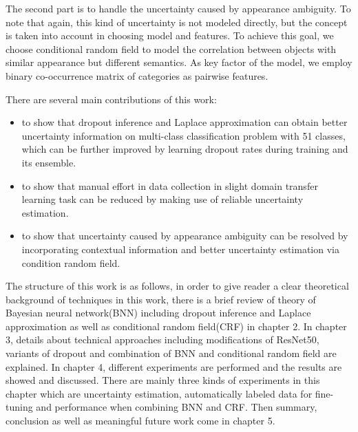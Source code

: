 The second part is to handle the uncertainty caused by appearance ambiguity. To note that again, this kind of uncertainty is not modeled directly, but the concept is taken into account in choosing model and features. To achieve this goal, we choose conditional random field to model the correlation between objects with similar appearance but different semantics. As key factor of the model, we employ binary co-occurrence matrix of categories as pairwise features.

There are several main contributions of this work:
\begin{itemize}
 \item to show that dropout inference and Laplace approximation can obtain better uncertainty information on multi-class classification problem with 51 classes, which can be further improved by learning dropout rates during training and its ensemble.
 
 \item to show that manual effort in data collection in slight domain transfer learning task can be reduced by making use of reliable uncertainty estimation.
 
 \item to show that uncertainty caused by appearance ambiguity can be resolved by incorporating contextual information and better uncertainty estimation via condition random field.
 
 
\end{itemize}

The structure of this work is as follows, in order to give reader a clear theoretical background of techniques in this work, there is a brief review of theory of Bayesian neural network(BNN) including dropout inference and Laplace approximation as well as conditional random field(CRF) in chapter 2. In chapter 3, details about technical approaches including modifications of ResNet50, variants of dropout and combination of BNN and conditional random field are explained.  In chapter 4, different experiments are performed and the results are showed and discussed. There are mainly three kinds of experiments in this chapter which are uncertainty estimation, automatically labeled data for fine-tuning and performance when combining BNN and CRF. Then summary, conclusion as well as meaningful future work come in chapter 5.